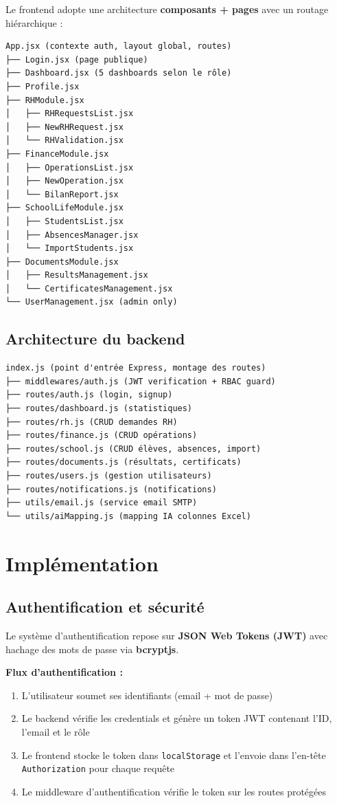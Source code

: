 \documentclass[12pt,a4paper]{report}
\begin{document}
Le frontend adopte une architecture \textbf{composants + pages} avec un routage hiérarchique :

\begin{verbatim}
App.jsx (contexte auth, layout global, routes)
├── Login.jsx (page publique)
├── Dashboard.jsx (5 dashboards selon le rôle)
├── Profile.jsx
├── RHModule.jsx
│   ├── RHRequestsList.jsx
│   ├── NewRHRequest.jsx
│   └── RHValidation.jsx
├── FinanceModule.jsx
│   ├── OperationsList.jsx
│   ├── NewOperation.jsx
│   └── BilanReport.jsx
├── SchoolLifeModule.jsx
│   ├── StudentsList.jsx
│   ├── AbsencesManager.jsx
│   └── ImportStudents.jsx
├── DocumentsModule.jsx
│   ├── ResultsManagement.jsx
│   └── CertificatesManagement.jsx
└── UserManagement.jsx (admin only)
\end{verbatim}

\section{Architecture du backend}

\begin{verbatim}
index.js (point d'entrée Express, montage des routes)
├── middlewares/auth.js (JWT verification + RBAC guard)
├── routes/auth.js (login, signup)
├── routes/dashboard.js (statistiques)
├── routes/rh.js (CRUD demandes RH)
├── routes/finance.js (CRUD opérations)
├── routes/school.js (CRUD élèves, absences, import)
├── routes/documents.js (résultats, certificats)
├── routes/users.js (gestion utilisateurs)
├── routes/notifications.js (notifications)
├── utils/email.js (service email SMTP)
└── utils/aiMapping.js (mapping IA colonnes Excel)
\end{verbatim}

\chapter{Implémentation}

\section{Authentification et sécurité}

Le système d'authentification repose sur \textbf{JSON Web Tokens (JWT)} avec hachage des mots de passe via \textbf{bcryptjs}.

\textbf{Flux d'authentification :}
\begin{enumerate}
    \item L'utilisateur soumet ses identifiants (email + mot de passe)
    \item Le backend vérifie les credentials et génère un token JWT contenant l'ID, l'email et le rôle
    \item Le frontend stocke le token dans \texttt{localStorage} et l'envoie dans l'en-tête \texttt{Authorization} pour chaque requête
    \item Le middleware d'authentification vérifie le token sur les routes protégées
\end{enumerate}
\end{document}
